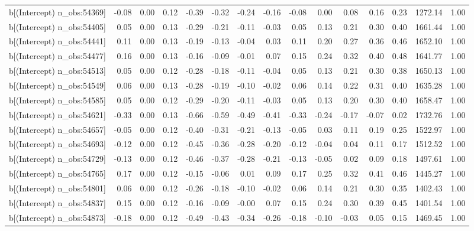 \begin{table}[ht]
\begin{tabular}{rrrrrrrrrrrrrrr}
  b[(Intercept) n\_obs:54369] & -0.08 & 0.00 & 0.12 & -0.39 & -0.32 & -0.24 & -0.16 & -0.08 & 0.00 & 0.08 & 0.16 & 0.23 & 1272.14 & 1.00 \\ 
  b[(Intercept) n\_obs:54405] & 0.05 & 0.00 & 0.13 & -0.29 & -0.21 & -0.11 & -0.03 & 0.05 & 0.13 & 0.21 & 0.30 & 0.40 & 1661.44 & 1.00 \\ 
  b[(Intercept) n\_obs:54441] & 0.11 & 0.00 & 0.13 & -0.19 & -0.13 & -0.04 & 0.03 & 0.11 & 0.20 & 0.27 & 0.36 & 0.46 & 1652.10 & 1.00 \\ 
  b[(Intercept) n\_obs:54477] & 0.16 & 0.00 & 0.13 & -0.16 & -0.09 & -0.01 & 0.07 & 0.15 & 0.24 & 0.32 & 0.40 & 0.48 & 1641.77 & 1.00 \\ 
  b[(Intercept) n\_obs:54513] & 0.05 & 0.00 & 0.12 & -0.28 & -0.18 & -0.11 & -0.04 & 0.05 & 0.13 & 0.21 & 0.30 & 0.38 & 1650.13 & 1.00 \\ 
  b[(Intercept) n\_obs:54549] & 0.06 & 0.00 & 0.13 & -0.28 & -0.19 & -0.10 & -0.02 & 0.06 & 0.14 & 0.22 & 0.31 & 0.40 & 1635.28 & 1.00 \\ 
  b[(Intercept) n\_obs:54585] & 0.05 & 0.00 & 0.12 & -0.29 & -0.20 & -0.11 & -0.03 & 0.05 & 0.13 & 0.20 & 0.30 & 0.40 & 1658.47 & 1.00 \\ 
  b[(Intercept) n\_obs:54621] & -0.33 & 0.00 & 0.13 & -0.66 & -0.59 & -0.49 & -0.41 & -0.33 & -0.24 & -0.17 & -0.07 & 0.02 & 1732.76 & 1.00 \\ 
  b[(Intercept) n\_obs:54657] & -0.05 & 0.00 & 0.12 & -0.40 & -0.31 & -0.21 & -0.13 & -0.05 & 0.03 & 0.11 & 0.19 & 0.25 & 1522.97 & 1.00 \\ 
  b[(Intercept) n\_obs:54693] & -0.12 & 0.00 & 0.12 & -0.45 & -0.36 & -0.28 & -0.20 & -0.12 & -0.04 & 0.04 & 0.11 & 0.17 & 1512.52 & 1.00 \\ 
  b[(Intercept) n\_obs:54729] & -0.13 & 0.00 & 0.12 & -0.46 & -0.37 & -0.28 & -0.21 & -0.13 & -0.05 & 0.02 & 0.09 & 0.18 & 1497.61 & 1.00 \\ 
  b[(Intercept) n\_obs:54765] & 0.17 & 0.00 & 0.12 & -0.15 & -0.06 & 0.01 & 0.09 & 0.17 & 0.25 & 0.32 & 0.41 & 0.46 & 1445.27 & 1.00 \\ 
  b[(Intercept) n\_obs:54801] & 0.06 & 0.00 & 0.12 & -0.26 & -0.18 & -0.10 & -0.02 & 0.06 & 0.14 & 0.21 & 0.30 & 0.35 & 1402.43 & 1.00 \\ 
  b[(Intercept) n\_obs:54837] & 0.15 & 0.00 & 0.12 & -0.16 & -0.09 & -0.00 & 0.07 & 0.15 & 0.24 & 0.30 & 0.39 & 0.45 & 1401.54 & 1.00 \\ 
  b[(Intercept) n\_obs:54873] & -0.18 & 0.00 & 0.12 & -0.49 & -0.43 & -0.34 & -0.26 & -0.18 & -0.10 & -0.03 & 0.05 & 0.15 & 1469.45 & 1.00 \\ 

\end{tabular}
\end{table}
